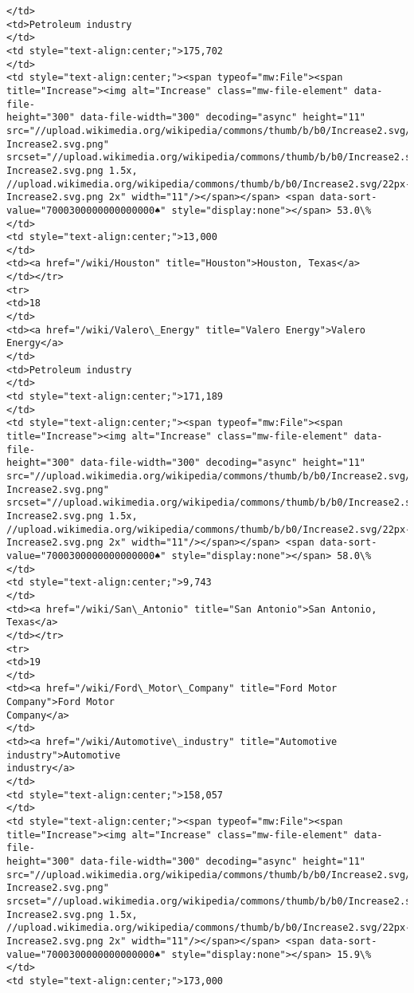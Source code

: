 \documentclass[11pt]{article}
\begin{document}
\begin{Verbatim}[commandchars=\\\{\}]
</td>
<td>Petroleum industry
</td>
<td style="text-align:center;">175,702
</td>
<td style="text-align:center;"><span typeof="mw:File"><span
title="Increase"><img alt="Increase" class="mw-file-element" data-file-
height="300" data-file-width="300" decoding="async" height="11"
src="//upload.wikimedia.org/wikipedia/commons/thumb/b/b0/Increase2.svg/11px-
Increase2.svg.png"
srcset="//upload.wikimedia.org/wikipedia/commons/thumb/b/b0/Increase2.svg/17px-
Increase2.svg.png 1.5x,
//upload.wikimedia.org/wikipedia/commons/thumb/b/b0/Increase2.svg/22px-
Increase2.svg.png 2x" width="11"/></span></span> <span data-sort-
value="7000300000000000000♠" style="display:none"></span> 53.0\%
</td>
<td style="text-align:center;">13,000
</td>
<td><a href="/wiki/Houston" title="Houston">Houston, Texas</a>
</td></tr>
<tr>
<td>18
</td>
<td><a href="/wiki/Valero\_Energy" title="Valero Energy">Valero Energy</a>
</td>
<td>Petroleum industry
</td>
<td style="text-align:center;">171,189
</td>
<td style="text-align:center;"><span typeof="mw:File"><span
title="Increase"><img alt="Increase" class="mw-file-element" data-file-
height="300" data-file-width="300" decoding="async" height="11"
src="//upload.wikimedia.org/wikipedia/commons/thumb/b/b0/Increase2.svg/11px-
Increase2.svg.png"
srcset="//upload.wikimedia.org/wikipedia/commons/thumb/b/b0/Increase2.svg/17px-
Increase2.svg.png 1.5x,
//upload.wikimedia.org/wikipedia/commons/thumb/b/b0/Increase2.svg/22px-
Increase2.svg.png 2x" width="11"/></span></span> <span data-sort-
value="7000300000000000000♠" style="display:none"></span> 58.0\%
</td>
<td style="text-align:center;">9,743
</td>
<td><a href="/wiki/San\_Antonio" title="San Antonio">San Antonio, Texas</a>
</td></tr>
<tr>
<td>19
</td>
<td><a href="/wiki/Ford\_Motor\_Company" title="Ford Motor Company">Ford Motor
Company</a>
</td>
<td><a href="/wiki/Automotive\_industry" title="Automotive industry">Automotive
industry</a>
</td>
<td style="text-align:center;">158,057
</td>
<td style="text-align:center;"><span typeof="mw:File"><span
title="Increase"><img alt="Increase" class="mw-file-element" data-file-
height="300" data-file-width="300" decoding="async" height="11"
src="//upload.wikimedia.org/wikipedia/commons/thumb/b/b0/Increase2.svg/11px-
Increase2.svg.png"
srcset="//upload.wikimedia.org/wikipedia/commons/thumb/b/b0/Increase2.svg/17px-
Increase2.svg.png 1.5x,
//upload.wikimedia.org/wikipedia/commons/thumb/b/b0/Increase2.svg/22px-
Increase2.svg.png 2x" width="11"/></span></span> <span data-sort-
value="7000300000000000000♠" style="display:none"></span> 15.9\%
</td>
<td style="text-align:center;">173,000

\end{Verbatim}
\end{document}
